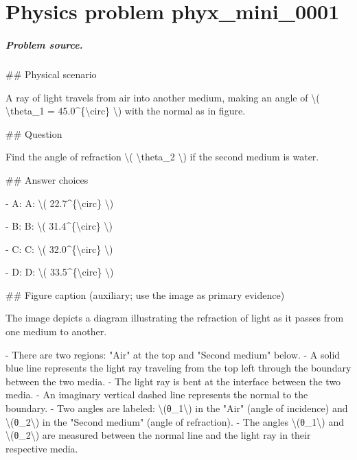 
\chapter{Physics problem phyx\_mini\_0001}
\label{ch:PhyXMiniProblems_problem_phyx_mini_0001}

\paragraph{Problem source.}
\#\# Physical scenario

A ray of light travels from air into another medium, making an angle of \textbackslash{}( \textbackslash{}theta\_1 = 45.0\textasciicircum{}\{\textbackslash{}circ\} \textbackslash{}) with the normal as in figure.

\#\# Question

Find the angle of refraction \textbackslash{}( \textbackslash{}theta\_2 \textbackslash{}) if the second medium is water.

\#\# Answer choices

- A: A: \textbackslash{}( 22.7\textasciicircum{}\{\textbackslash{}circ\} \textbackslash{})

- B: B: \textbackslash{}( 31.4\textasciicircum{}\{\textbackslash{}circ\} \textbackslash{})

- C: C: \textbackslash{}( 32.0\textasciicircum{}\{\textbackslash{}circ\} \textbackslash{})

- D: D: \textbackslash{}( 33.5\textasciicircum{}\{\textbackslash{}circ\} \textbackslash{})

\#\# Figure caption (auxiliary; use the image as primary evidence)

The image depicts a diagram illustrating the refraction of light as it passes from one medium to another. 

- There are two regions: "Air" at the top and "Second medium" below.
- A solid blue line represents the light ray traveling from the top left through the boundary between the two media.
- The light ray is bent at the interface between the two media.
- An imaginary vertical dashed line represents the normal to the boundary.
- Two angles are labeled: \textbackslash{}(θ\_1\textbackslash{}) in the "Air" (angle of incidence) and \textbackslash{}(θ\_2\textbackslash{}) in the "Second medium" (angle of refraction).
- The angles \textbackslash{}(θ\_1\textbackslash{}) and \textbackslash{}(θ\_2\textbackslash{}) are measured between the normal line and the light ray in their respective media.

